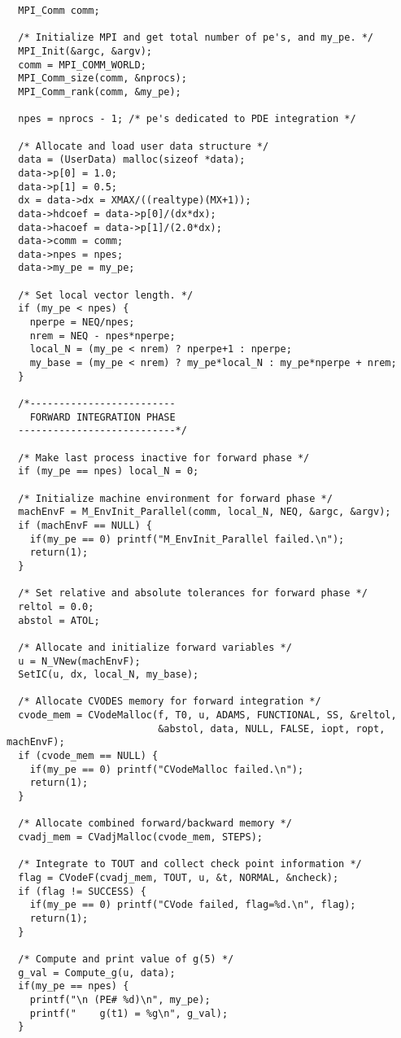 \begin{verbatim}
  MPI_Comm comm;

  /* Initialize MPI and get total number of pe's, and my_pe. */
  MPI_Init(&argc, &argv);
  comm = MPI_COMM_WORLD;
  MPI_Comm_size(comm, &nprocs);
  MPI_Comm_rank(comm, &my_pe);

  npes = nprocs - 1; /* pe's dedicated to PDE integration */

  /* Allocate and load user data structure */
  data = (UserData) malloc(sizeof *data);
  data->p[0] = 1.0;
  data->p[1] = 0.5;
  dx = data->dx = XMAX/((realtype)(MX+1));
  data->hdcoef = data->p[0]/(dx*dx);
  data->hacoef = data->p[1]/(2.0*dx);
  data->comm = comm;
  data->npes = npes;
  data->my_pe = my_pe;

  /* Set local vector length. */
  if (my_pe < npes) {
    nperpe = NEQ/npes;
    nrem = NEQ - npes*nperpe;
    local_N = (my_pe < nrem) ? nperpe+1 : nperpe;
    my_base = (my_pe < nrem) ? my_pe*local_N : my_pe*nperpe + nrem;
  }

  /*------------------------- 
    FORWARD INTEGRATION PHASE 
  ---------------------------*/

  /* Make last process inactive for forward phase */
  if (my_pe == npes) local_N = 0;

  /* Initialize machine environment for forward phase */
  machEnvF = M_EnvInit_Parallel(comm, local_N, NEQ, &argc, &argv);
  if (machEnvF == NULL) {
    if(my_pe == 0) printf("M_EnvInit_Parallel failed.\n"); 
    return(1);
  }

  /* Set relative and absolute tolerances for forward phase */
  reltol = 0.0;
  abstol = ATOL;

  /* Allocate and initialize forward variables */
  u = N_VNew(machEnvF);
  SetIC(u, dx, local_N, my_base);

  /* Allocate CVODES memory for forward integration */
  cvode_mem = CVodeMalloc(f, T0, u, ADAMS, FUNCTIONAL, SS, &reltol,
                          &abstol, data, NULL, FALSE, iopt, ropt, machEnvF);
  if (cvode_mem == NULL) {
    if(my_pe == 0) printf("CVodeMalloc failed.\n"); 
    return(1);
  }

  /* Allocate combined forward/backward memory */
  cvadj_mem = CVadjMalloc(cvode_mem, STEPS);

  /* Integrate to TOUT and collect check point information */
  flag = CVodeF(cvadj_mem, TOUT, u, &t, NORMAL, &ncheck);
  if (flag != SUCCESS) {
    if(my_pe == 0) printf("CVode failed, flag=%d.\n", flag);
    return(1);
  }

  /* Compute and print value of g(5) */
  g_val = Compute_g(u, data);
  if(my_pe == npes) {
    printf("\n (PE# %d)\n", my_pe);
    printf("    g(t1) = %g\n", g_val);
  }


\end{verbatim}
